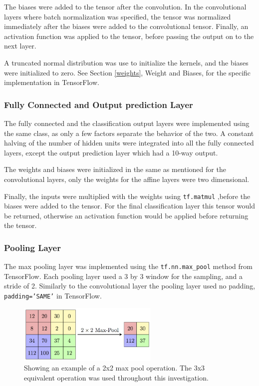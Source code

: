 \documentclass[]{article}
\begin{document}
The biases were added to the tensor after the convolution. In the convolutional layers where batch normalization was specified, the tensor was normalized immediately after the biases were added to the convolutional tensor. Finally, an activation function was applied to the tensor, before passing the output on to the next layer. 

A truncated normal distribution was use to initialize the kernels, and the biases were initialized to zero. See Section \ref{weights}, Weight and Biases, for the specific implementation in TensorFlow. 

\subsubsection{Fully Connected and Output prediction Layer}

The fully connected and the classification output layers were implemented using the same class, as only a few factors separate the behavior of the two. A constant halving of the number of hidden units were integrated into all the fully connected layers, except the output prediction layer which had a 10-way output.

The weights and biases were initialized in the same as mentioned for the convolutional layers, only the weights for the affine layers were two dimensional. 

Finally, the inputs were multiplied with the weights using \texttt{tf.matmul} ,before the biases were added to the tensor. For the final classification layer this tensor would be returned, otherwise an activation function would be applied before returning the tensor.

\subsubsection{Pooling Layer}

The max pooling layer was implemented using the \texttt{tf.nn.max\_pool} method from TensorFlow. Each pooling layer used a 3 by 3 window for the sampling, and a stride of 2. Similarly to the convolutional layer the pooling layer used no padding, \texttt{padding='SAME'} in TensorFlow. 

\begin{figure}[h]
	\centering
	\includegraphics[width=0.6\textwidth]{pool}
	\caption{Showing an example of a 2x2 max pool operation. The 3x3 equivalent operation was used throughout this investigation.}
	\label{pool}
	\centering
\end{figure}
\end{document}
